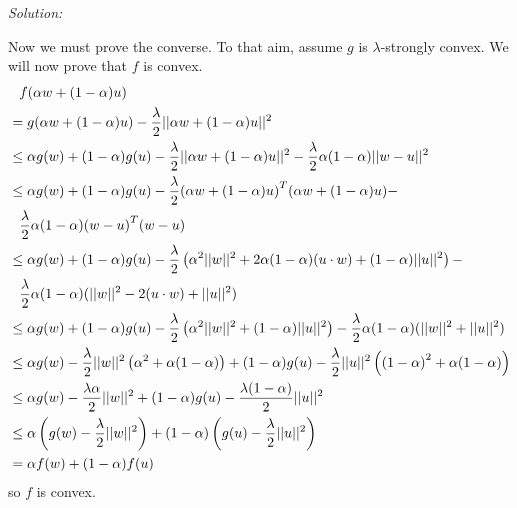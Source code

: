 \documentclass[
	10pt, %
	a4paper, %
	oneside, %
	headinclude,footinclude, %
	BCOR5mm, %
]{scrartcl}
\newenvironment{solution}
{\textit{Solution:}}
{}
\begin{document}
\begin{solution}
\begin{enumerate}[label= (\alph*)]
		      Now we must prove the converse. To that aim, assume $g$ is $\lambda$-strongly convex. We will now prove that $f$ is convex.
		      \begin{align*}
			       & \hphantom{=} f(\alpha w + (1-\alpha)u)                                                                                                                                          \\
			       & = g(\alpha w + (1-\alpha)u) - \frac{\lambda}{2}||\alpha w + (1-\alpha)u||^2                                                                                                     \\
			       & \leq \alpha g(w) + (1-\alpha)g(u) - \frac{\lambda}{2}||\alpha w + (1-\alpha) u||^2 - \frac{\lambda}{2}\alpha(1-\alpha)||w-u||^2                                                 \\
			       & \leq \alpha g(w) + (1-\alpha)g(u) - \frac{\lambda}{2}{(\alpha w + (1-\alpha) u)}^T(\alpha w + (1-\alpha) u) -                                                                   \\
			       & \hphantom{\leq} \frac{\lambda}{2}\alpha(1-\alpha){(w-u)}^T(w-u)                                                                                                                 \\
			       & \leq \alpha g(w) + (1-\alpha)g(u) - \frac{\lambda}{2}\left(\alpha^2 ||w||^2 + 2\alpha(1-\alpha)(u \cdot w) + (1-\alpha) ||u||^2\right) -                                        \\
			       & \hphantom{\leq} \frac{\lambda}{2}\alpha(1-\alpha)(||w||^2 - 2(u\cdot w) + ||u||^2)                                                                                              \\
			       & \leq \alpha g(w) + (1-\alpha)g(u) - \frac{\lambda}{2}\left(\alpha^2 ||w||^2 + (1-\alpha) ||u||^2\right) - \frac{\lambda}{2}\alpha(1-\alpha)(||w||^2 + ||u||^2)                  \\
			       & \leq \alpha g(w) - \frac{\lambda}{2}||w||^2\left(\alpha^2 + \alpha(1-\alpha) \right)  + (1-\alpha)g(u) - \frac{\lambda}{2}||u||^2\left({(1-\alpha)}^2 + \alpha(1-\alpha)\right) \\
			       & \leq \alpha g(w) - \frac{\lambda\alpha}{2}||w||^2  + (1-\alpha)g(u) - \frac{\lambda(1-\alpha)}{2}||u||^2                                                                        \\
			       & \leq \alpha \left(g(w) - \frac{\lambda}{2}||w||^2\right) + (1-\alpha)\left(g(u) - \frac{\lambda}{2}||u||^2\right)                                                               \\
			       & = \alpha f(w) + (1-\alpha)f(u)
		      \end{align*}
		      so $f$ is convex.
	\end{enumerate}
\end{solution}
\end{document}
